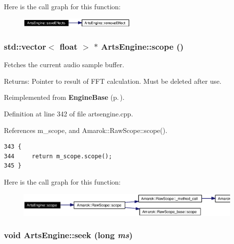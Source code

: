 Here is the call graph for this function:\begin{figure}[H]
\begin{center}
\leavevmode
\includegraphics[width=164pt]{classArtsEngine_ArtsEngined3_cgraph}
\end{center}
\end{figure}
\subsubsection{\setlength{\rightskip}{0pt plus 5cm}std::vector$<$ float $>$ $\ast$ Arts\-Engine::scope ()\hspace{0.3cm}{\tt  [virtual]}}\label{classArtsEngine_ArtsEnginea9}


Fetches the current audio sample buffer. \begin{Desc}
\item[Returns:]Pointer to result of FFT calculation. Must be deleted after use. \end{Desc}


Reimplemented from {\bf Engine\-Base} {\rm (p.\,\pageref{classEngineBase_EngineBasea14})}.

Definition at line 342 of file artsengine.cpp.

References m\_\-scope, and Amarok::Raw\-Scope::scope().



\footnotesize\begin{verbatim}343 {
344     return m_scope.scope();
345 }
\end{verbatim}\normalsize 


Here is the call graph for this function:\begin{figure}[H]
\begin{center}
\leavevmode
\includegraphics[width=359pt]{classArtsEngine_ArtsEnginea9_cgraph}
\end{center}
\end{figure}
\subsubsection{\setlength{\rightskip}{0pt plus 5cm}void Arts\-Engine::seek (long {\em ms})\hspace{0.3cm}{\tt  [virtual, slot]}}\label{classArtsEngine_ArtsEnginei4}




